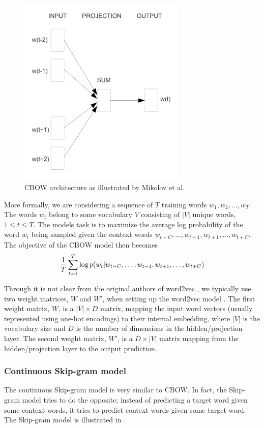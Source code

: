 \begin{figure}[ht]
    \centering
    \includegraphics[width=8cm]{thesis/figures/cbow-mikolov-et-al-2013.png}
    \caption{CBOW architecture as illustrated by Mikolov et al. \cite{mikolov2013a}}
    \label{fig:cbow-model}
\end{figure}

\noindent
More formally, we are considering a sequence of $T$ training words $w_1, w_2, \ldots, w_T$. The words $w_t$ belong to some vocabulary $V$ consisting of $|V|$ unique words, $1 \leq t \leq T$. The models task is to maximize the average log probability of the word $w_t$ being sampled given the context words $w_{t-C}, \ldots, w_{t-1}, w_{t+1}, \ldots, w_{t+C}$. The objective of the CBOW model then becomes
\begin{align}
    \frac{1}{T} \sum\limits_{t=1}^{T} \log p(w_t | w_{t-C}, \ldots, w_{t-1}, w_{t+1}, \ldots, w_{t+C})
    \label{eqn:cbow-objective-function}
\end{align}

\noindent
Through it is not clear from the original authors of word2vec \cite{mikolov2013a, mikolov2013b}, we typically use two weight matrices, $W$ and $W'$, when setting up the word2vec model \cite{rong2014word2vec}. The first weight matrix, $W$, is a $|V| \times D$ matrix, mapping the input word vectors (usually represented using one-hot encodings) to their internal embedding, where $|V|$ is the vocabulary size and $D$ is the number of dimensions in the hidden/projection layer. The second weight matrix, $W'$, is a $D \times |V|$ matrix mapping from the hidden/projection layer to the output prediction.

\subsubsection{Continuous Skip-gram model}
The continuous Skip-gram model is very similar to CBOW. In fact, the Skip-gram model tries to do the opposite; instead of predicting a target word given some context words, it tries to predict context words given some target word. The Skip-gram model is illustrated in .

